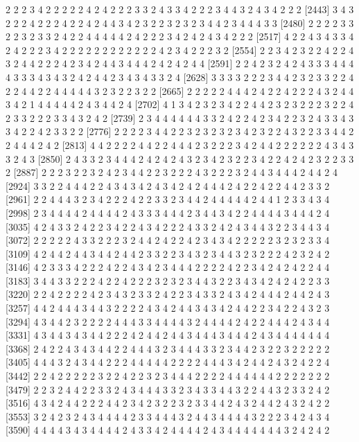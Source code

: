 \begin{Schunk}
\begin{Soutput}
[2406] 2 2 2 3 4 2 2 2 2 2 4 2 4 2 2 2 3 3 2 4 3 3 4 2 2 2 3 4 4 3 2 4 3 4 2 2 2
[2443] 3 4 3 2 2 2 4 2 2 2 4 2 2 4 2 4 4 3 4 2 3 2 2 3 2 3 2 3 4 4 2 3 4 4 4 3 3
[2480] 2 2 2 2 3 3 2 2 3 2 3 3 2 4 2 2 4 4 4 4 4 2 4 2 2 2 3 4 2 4 2 4 3 4 2 2 2
[2517] 4 2 2 4 3 4 3 3 4 2 4 2 2 2 3 4 2 2 2 2 2 2 2 2 2 2 2 2 4 2 3 4 2 2 2 3 2
[2554] 2 2 3 4 2 3 2 2 4 2 2 4 3 2 4 4 2 2 2 4 2 3 4 2 4 4 3 4 4 4 2 4 2 4 2 4 4
[2591] 2 2 4 2 3 2 4 2 4 3 3 3 4 4 4 4 3 3 3 4 3 4 3 2 4 2 4 4 2 3 4 3 4 3 3 2 4
[2628] 3 3 3 3 2 2 2 3 4 4 2 3 2 3 3 2 2 4 2 2 4 4 2 2 4 4 4 4 4 3 2 3 2 2 3 2 2
[2665] 2 2 2 2 2 4 4 4 2 4 2 2 4 2 2 2 4 3 2 4 4 3 4 2 1 4 4 4 4 4 2 4 3 4 4 2 4
[2702] 4 1 3 4 2 3 2 3 4 2 2 4 4 2 3 2 3 2 2 2 3 2 2 4 2 3 3 2 2 2 3 3 4 3 2 4 2
[2739] 2 3 4 4 4 4 4 4 3 3 2 4 2 2 4 2 3 4 2 2 3 2 4 3 3 4 3 3 4 2 2 4 2 3 3 2 2
[2776] 2 2 2 2 3 4 4 2 2 3 2 3 2 3 2 3 4 2 3 2 2 4 3 2 2 3 3 4 4 2 2 4 4 4 2 4 2
[2813] 4 4 2 2 2 2 4 4 2 2 4 4 4 2 3 2 2 2 3 4 2 4 4 2 2 2 2 2 2 4 3 4 3 3 2 4 3
[2850] 2 4 3 3 2 3 4 4 4 2 4 2 4 2 4 3 2 3 4 2 3 2 2 3 4 2 2 4 2 4 2 3 2 2 3 3 2
[2887] 2 2 2 3 2 2 3 2 4 2 3 4 4 2 2 3 2 2 2 4 3 2 2 2 3 2 4 4 3 4 4 4 2 4 4 2 4
[2924] 3 3 2 2 4 4 4 2 2 4 3 4 3 4 2 4 3 4 2 4 2 4 4 4 2 4 2 2 4 2 2 4 4 2 3 3 2
[2961] 2 2 4 4 4 3 2 3 4 2 2 2 4 2 2 3 3 2 3 4 4 2 4 4 4 4 4 2 4 4 1 2 3 3 4 3 4
[2998] 2 3 4 4 4 4 2 4 4 4 4 2 4 3 3 3 4 4 4 2 3 4 4 3 4 2 2 4 4 4 4 3 4 4 4 2 4
[3035] 4 2 4 3 3 2 4 2 2 3 4 2 2 4 3 4 2 2 2 4 3 3 2 4 2 4 3 4 4 3 2 2 3 4 4 3 4
[3072] 2 2 2 2 2 4 3 3 2 2 2 3 2 4 4 2 4 2 2 4 2 3 4 3 4 2 2 2 2 2 3 2 3 2 3 3 4
[3109] 4 2 4 4 2 4 4 3 4 4 2 4 4 2 3 3 2 2 3 4 3 2 3 4 4 3 2 3 2 2 2 4 2 3 2 4 2
[3146] 4 2 3 3 3 4 2 2 2 4 2 2 4 3 4 2 3 4 4 4 2 2 2 2 4 2 2 3 4 2 4 2 4 2 2 4 4
[3183] 3 4 4 3 3 2 2 2 4 2 2 4 2 2 2 3 2 3 2 3 4 4 3 2 2 3 4 3 4 2 4 2 4 2 2 3 3
[3220] 2 2 4 2 2 2 2 4 2 3 4 3 2 3 3 2 4 2 2 3 4 3 3 2 4 3 4 2 4 4 4 2 4 4 2 4 3
[3257] 4 4 2 4 4 4 3 4 4 3 2 2 2 2 4 3 4 2 4 4 3 4 3 4 2 4 4 2 2 3 4 2 2 4 3 2 3
[3294] 4 3 4 4 2 3 2 2 2 2 4 4 4 3 3 4 4 4 4 3 2 4 4 4 4 2 4 2 2 4 4 4 2 4 3 4 4
[3331] 4 3 4 4 3 4 3 4 4 2 2 2 4 2 4 4 2 4 4 3 4 4 4 3 4 4 4 2 4 3 4 4 4 4 4 4 4
[3368] 2 4 2 2 4 3 4 3 4 4 2 2 4 4 4 3 2 3 4 4 4 3 3 2 3 4 4 2 3 2 2 3 2 2 2 2 2
[3405] 4 4 4 3 2 4 3 4 4 2 2 2 4 4 4 4 4 2 2 2 2 4 4 4 3 4 2 4 4 2 4 3 2 4 2 2 4
[3442] 2 2 4 2 2 2 2 2 3 2 2 4 2 2 3 2 3 4 4 4 2 2 2 2 4 4 4 4 4 4 2 2 2 2 2 2 2
[3479] 2 2 3 2 4 4 2 2 3 3 2 4 3 4 4 4 3 3 2 3 4 3 3 4 4 3 2 2 4 4 3 2 3 3 2 4 2
[3516] 4 3 4 2 4 4 2 2 2 4 4 2 3 4 2 3 2 2 3 2 3 3 4 4 2 4 3 2 4 4 2 4 3 2 4 2 2
[3553] 3 2 4 2 3 2 4 3 4 4 4 4 2 3 3 4 4 4 3 2 4 4 3 4 4 4 4 3 2 2 2 3 4 2 4 3 4
[3590] 4 4 4 4 3 4 3 4 4 4 4 2 4 3 3 4 2 4 4 4 4 2 4 3 4 4 4 4 4 4 4 3 2 4 2 4 2

\end{Soutput}
\end{Schunk}
